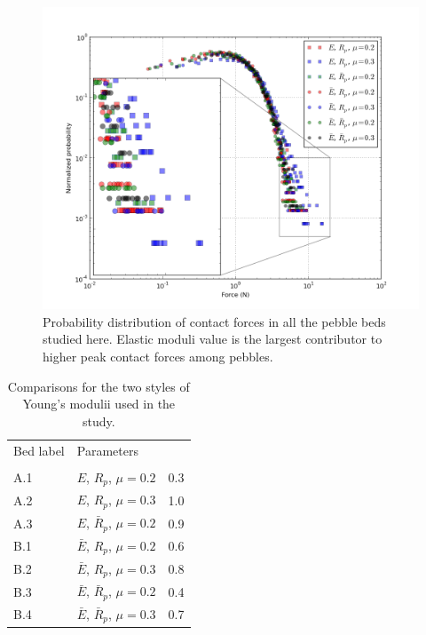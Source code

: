 \begin{figure}[t]
  \centering
  \includegraphics[width = 0.75 \textwidth]{chapters/figures/all-contact-forces}
  \caption{Probability distribution of contact forces in all the pebble beds studied here. Elastic moduli value is the largest contributor to higher peak contact forces among pebbles.}\label{fig:all-contact-forces}
\end{figure}


\begin{table}[t]
\caption{Comparisons for the two styles of Young's modulii used in the study. }
\label{tab:num-crush-percent}\centering
\begin{tabular}{llS[table-format=3.2]}
\toprule
Bed label		& 		Parameters 								&				\\
				& 												&			\\\otoprule
A.1				& 		$E$, $R_p$, $\mu = 0.2$          		&	0.3									\\\midrule
A.2				& 		$E$, $R_p$, $\mu = 0.3$     			&	1.0									\\\midrule
A.3				& 		$E$, $\bar{R}_p$, $\mu = 0.2$			&	0.9									\\\midrule
B.1				& 		$\bar{E}$, $R_p$, $\mu = 0.2$			&	0.6									\\\midrule
B.2				& 		$\bar{E}$, $R_p$, $\mu = 0.3$			&	0.8									\\\midrule
B.3				& 		$\bar{E}$, $\bar{R}_p$, $\mu = 0.2$		&	0.4									\\\midrule
B.4				& 		$\bar{E}$, $\bar{R}_p$, $\mu = 0.3$		&	0.7									\\\bottomrule
\end{tabular}
\end{table}






